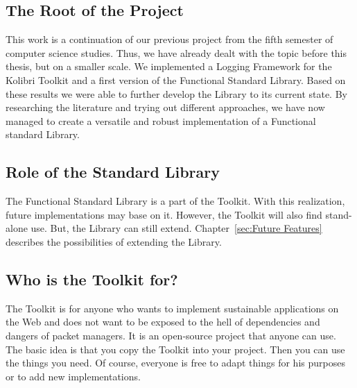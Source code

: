 \subsection{The Root of the Project}
\label{The Root of the Project}
This work is a continuation of our previous project from the fifth semester of
computer science studies. Thus, we have already dealt with the topic before
this thesis, but on a smaller scale. We implemented a Logging Framework for the
Kolibri Toolkit and a first version of the Functional Standard Library. Based
on these results we were able to further develop the Library to its current
state. By researching the literature and trying out different approaches, we
have now managed to create a versatile and robust implementation of a
Functional standard Library.

\subsection{Role of the Standard Library}
\label{sub:Role of the Standard Library}
The Functional Standard Library is a part of the Toolkit. With
this realization, future implementations may base on it. However, the Toolkit
will also find stand-alone use. But, the Library can still extend.
Chapter~\ref{sec:Future Features} describes the possibilities of extending the Library.

\subsection{Who is the Toolkit for?}
\label{sub:Who is the Toolkit for?}
The Toolkit is for anyone who wants to implement sustainable applications on
the Web and does not want to be exposed to the hell of dependencies and dangers
of packet managers. It is an open-source project that
anyone can use. The basic idea is that you copy the Toolkit into your project.
Then you can use the things you need. Of course, everyone is free to adapt
things for his purposes or to add new implementations.


